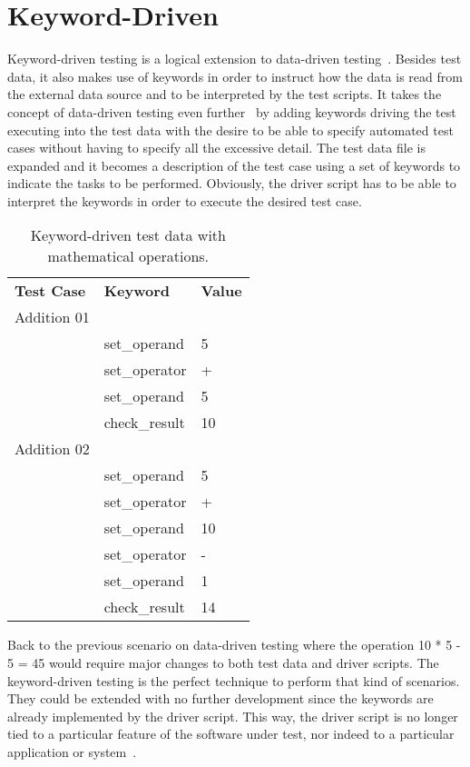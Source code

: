 \section{Keyword-Driven}

Keyword-driven testing is a logical extension to data-driven testing~\cite{Fewster99}.
Besides test data, it also makes use of keywords in order to instruct how the
data is read from the external data source and to be interpreted by the test
scripts. It takes the concept of data-driven testing even further~\cite{Lau07}
by adding keywords driving the test executing into the test data with the desire
to be able to specify automated test cases without having to specify all the
excessive detail. The test data file is expanded and it becomes a description of
the test case using a set of keywords to indicate the tasks to be performed.
Obviously, the driver script has to be able to interpret the keywords in order
to execute the desired test case.

\begin{table}[!ht]
\centering
\begin{tabular}{lll}
\textbf{Test Case} & \textbf{Keyword} & \textbf{Value} \\
Addition 01 & & \\
& set\_operand & 5 \\
& set\_operator & + \\
& set\_operand & 5 \\
& check\_result & 10 \\
Addition 02  & & \\
& set\_operand & 5 \\
& set\_operator & + \\
& set\_operand & 10 \\
& set\_operator & - \\
& set\_operand & 1 \\
& check\_result & 14 \\
\end{tabular}
\caption{Keyword-driven test data with mathematical operations.}
\label{table:tab2}
\end{table}

Back to the previous scenario on data-driven testing where the operation
10 * 5 - 5 = 45 would require major changes to both test data and driver
scripts. The keyword-driven testing is the perfect technique to perform that
kind of scenarios. They could be extended with no further development since the
keywords are already implemented by the driver script. This way, the driver
script is no longer tied to a particular feature of the software under test,
nor indeed to a particular application or system~\cite{Fewster99}.

